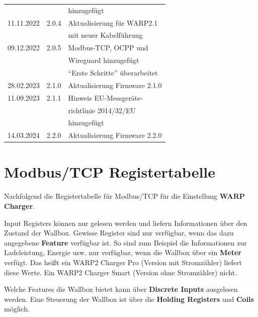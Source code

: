 \documentclass[a4paper,10pt]{article}
\begin{document}
\begin{multicols*}{2}
\begin{tabular}{lll}
                   &         & hinzugefügt                     \\
        11.11.2022 & 2.0.4   & Aktualisierung für WARP2.1      \\
                   &         & mit neuer Kabelführung          \\
        09.12.2022 & 2.0.5   & Modbus-TCP, OCPP und            \\
                   &         & Wireguard hinzugefügt           \\
                   &         & \enquote{Erste Schritte} überarbeitet \\
        28.02.2023 & 2.1.0   & Aktualisierung Firmware 2.1.0   \\
        11.09.2023 & 2.1.1   & Hinweis EU-Messgeräte-          \\
                   &         & richtlinie 2014/32/EU           \\
                   &         & hinzugefügt                     \\
        14.03.2024 & 2.2.0   & Aktualisierung Firmware 2.2.0   \\
        \bottomrule
    \end{tabular}

    \vfill
    \null

    \columnbreak
\appendix

\section{Modbus/TCP Registertabelle}
\label{modbus_tcp_registertabelle}
Nachfolgend die Registertabelle für Modbus/TCP für die Einstellung \textbf{WARP
Charger}.

Input Registers können nur gelesen werden und liefern Informationen über den
Zustand der Wallbox. Gewisse Register sind nur verfügbar, wenn das dazu
angegebene \textbf{Feature} verfügbar ist. So sind zum Beispiel die
Informationen zur Ladeleistung, Energie usw. nur verfügbar, wenn die Wallbox
über ein \textbf{Meter} verfügt. Das heißt ein WARP2 Charger Pro (Version mit
Stromzähler) liefert diese Werte. Ein WARP2 Charger Smart (Version ohne
Stromzähler) nicht.

Welche Features die Wallbox bietet kann über \textbf{Discrete Inputs} ausgelesen
werden. Eine Steuerung der Wallbox ist über die \textbf{Holding Registers} und \textbf{Coils}
möglich.
\end{multicols*}
\end{document}
